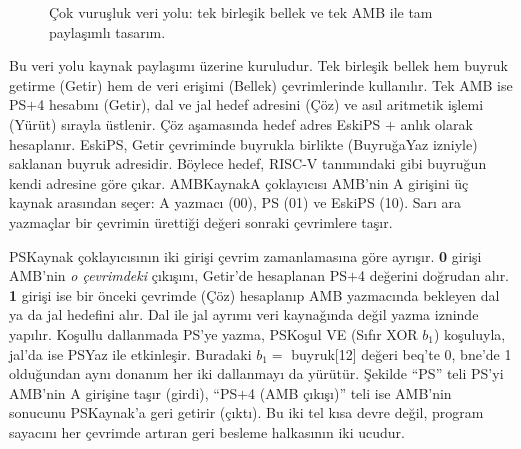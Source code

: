\begin{figure}[htbp]
\caption[Çok vuruşluk veri yolu: tek birleşik bellek ve tek AMB]{Çok vuruşluk veri yolu: tek birleşik bellek ve tek AMB ile tam paylaşımlı tasarım.}
\label{fig:cok-vurusluk-veriyolu}
\end{figure}

Bu veri yolu kaynak paylaşımı üzerine kuruludur. Tek birleşik bellek hem buyruk getirme (Getir) hem de veri erişimi (Bellek) çevrimlerinde kullanılır. Tek AMB ise PS$+$4 hesabını (Getir), dal ve jal hedef adresini (Çöz) ve asıl aritmetik işlemi (Yürüt) sırayla üstlenir. Çöz aşamasında hedef adres EskiPS $+$ anlık olarak hesaplanır. EskiPS, Getir çevriminde buyrukla birlikte (BuyruğaYaz izniyle) saklanan buyruk adresidir. Böylece hedef, RISC-V tanımındaki gibi buyruğun kendi adresine göre çıkar. AMBKaynakA çoklayıcısı AMB'nin A girişini üç kaynak arasından seçer: A yazmacı (00), PS (01) ve EskiPS (10). Sarı ara yazmaçlar bir çevrimin ürettiği değeri sonraki çevrimlere taşır.

PSKaynak çoklayıcısının iki girişi çevrim zamanlamasına göre ayrışır. \textbf{0} girişi AMB'nin \emph{o çevrimdeki} çıkışını, Getir'de hesaplanan PS$+$4 değerini doğrudan alır. \textbf{1} girişi ise bir önceki çevrimde (Çöz) hesaplanıp AMB yazmacında bekleyen dal ya da jal hedefini alır. Dal ile jal ayrımı veri kaynağında değil yazma izninde yapılır. Koşullu dallanmada PS'ye yazma, PSKoşul VE (Sıfır XOR $b_1$) koşuluyla, jal'da ise PSYaz ile etkinleşir. Buradaki $b_1 = $ buyruk[12] değeri beq'te 0, bne'de 1 olduğundan aynı donanım her iki dallanmayı da yürütür. Şekilde ``PS'' teli PS'yi AMB'nin A girişine taşır (girdi), ``PS$+$4 (AMB çıkışı)'' teli ise AMB'nin sonucunu PSKaynak'a geri getirir (çıktı). Bu iki tel kısa devre değil, program sayacını her çevrimde artıran geri besleme halkasının iki ucudur.

